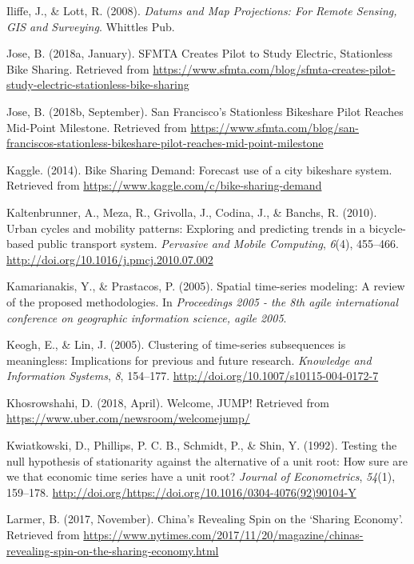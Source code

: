 \documentclass[12pt,oneside]{reedthesis}
\begin{document}
\hypertarget{ref-iliffe2008}{}
Iliffe, J., \& Lott, R. (2008). \emph{Datums and Map Projections: For
Remote Sensing, GIS and Surveying}. Whittles Pub.

\hypertarget{ref-sfmta2018one}{}
Jose, B. (2018a, January). SFMTA Creates Pilot to Study Electric,
Stationless Bike Sharing. Retrieved from
\url{https://www.sfmta.com/blog/sfmta-creates-pilot-study-electric-stationless-bike-sharing}

\hypertarget{ref-sfmta2018two}{}
Jose, B. (2018b, September). San Francisco's Stationless Bikeshare Pilot
Reaches Mid-Point Milestone. Retrieved from
\url{https://www.sfmta.com/blog/san-franciscos-stationless-bikeshare-pilot-reaches-mid-point-milestone}

\hypertarget{ref-kaggle}{}
Kaggle. (2014). Bike Sharing Demand: Forecast use of a city bikeshare
system. Retrieved from
\url{https://www.kaggle.com/c/bike-sharing-demand}

\hypertarget{ref-kaltenbrunner2010}{}
Kaltenbrunner, A., Meza, R., Grivolla, J., Codina, J., \& Banchs, R.
(2010). Urban cycles and mobility patterns: Exploring and predicting
trends in a bicycle-based public transport system. \emph{Pervasive and
Mobile Computing}, \emph{6}(4), 455--466.
\url{http://doi.org/10.1016/j.pmcj.2010.07.002}

\hypertarget{ref-kamarianakis2005}{}
Kamarianakis, Y., \& Prastacos, P. (2005). Spatial time-series modeling:
A review of the proposed methodologies. In \emph{Proceedings 2005 - the
8th agile international conference on geographic information science,
agile 2005}.

\hypertarget{ref-keogh2005}{}
Keogh, E., \& Lin, J. (2005). Clustering of time-series subsequences is
meaningless: Implications for previous and future research.
\emph{Knowledge and Information Systems}, \emph{8}, 154--177.
\url{http://doi.org/10.1007/s10115-004-0172-7}

\hypertarget{ref-uber2018}{}
Khosrowshahi, D. (2018, April). Welcome, JUMP! Retrieved from
\url{https://www.uber.com/newsroom/welcomejump/}

\hypertarget{ref-kwiat1992}{}
Kwiatkowski, D., Phillips, P. C. B., Schmidt, P., \& Shin, Y. (1992).
Testing the null hypothesis of stationarity against the alternative of a
unit root: How sure are we that economic time series have a unit root?
\emph{Journal of Econometrics}, \emph{54}(1), 159--178.
\url{http://doi.org/https://doi.org/10.1016/0304-4076(92)90104-Y}

\hypertarget{ref-nytimes}{}
Larmer, B. (2017, November). China's Revealing Spin on the `Sharing
Economy'. Retrieved from
\url{https://www.nytimes.com/2017/11/20/magazine/chinas-revealing-spin-on-the-sharing-economy.html}
\end{document}
